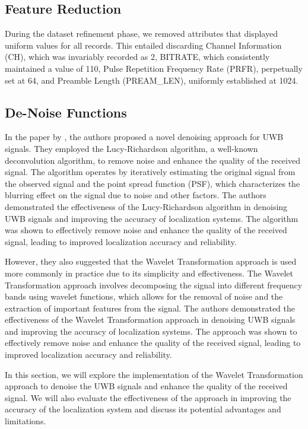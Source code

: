 \subsection{Feature Reduction}\label{feature_reduction}
During the dataset refinement phase, we removed attributes that displayed uniform values for all records. This entailed discarding Channel Information (CH), which was invariably recorded as 2, BITRATE, which consistently maintained a value of 110, Pulse Repetition Frequency Rate (PRFR), perpetually set at 64, and Preamble Length (PREAM\_LEN), uniformly established at 1024.

\subsection{De-Noise Functions}\label{de_noise_Functions}

In the paper by \cite{jiang_uwb_2020}, the authors proposed a novel denoising approach for UWB signals. They employed the Lucy-Richardson algorithm, a well-known deconvolution algorithm, to remove noise and enhance the quality of the received signal. The algorithm operates by iteratively estimating the original signal from the observed signal and the point spread function (PSF), which characterizes the blurring effect on the signal due to noise and other factors. The authors demonstrated the effectiveness of the Lucy-Richardson algorithm in denoising UWB signals and improving the accuracy of localization systems. The algorithm was shown to effectively remove noise and enhance the quality of the received signal, leading to improved localization accuracy and reliability.

However, they also suggested that the Wavelet Transformation approach is used more commonly in practice due to its simplicity and effectiveness. The Wavelet Transformation approach involves decomposing the signal into different frequency bands using wavelet functions, which allows for the removal of noise and the extraction of important features from the signal. The authors demonstrated the effectiveness of the Wavelet Transformation approach in denoising UWB signals and improving the accuracy of localization systems. The approach was shown to effectively remove noise and enhance the quality of the received signal, leading to improved localization accuracy and reliability.

In this section, we will explore the implementation of the Wavelet Transformation approach to denoise the UWB signals and enhance the quality of the received signal. We will also evaluate the effectiveness of the approach in improving the accuracy of the localization system and discuss its potential advantages and limitations.

